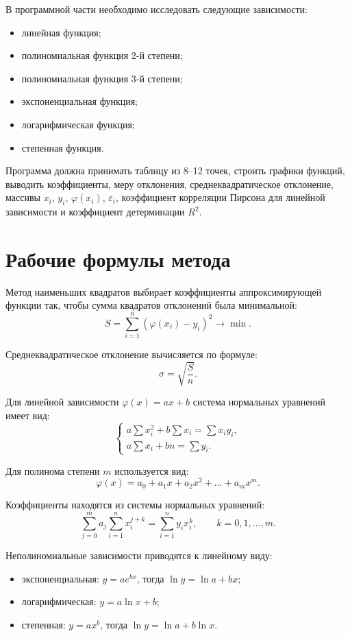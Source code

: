 \documentclass[a4paper,14pt]{extarticle}
\begin{document}
В программной части необходимо исследовать следующие зависимости:
\begin{itemize}
    \item линейная функция;
    \item полиномиальная функция 2-й степени;
    \item полиномиальная функция 3-й степени;
    \item экспоненциальная функция;
    \item логарифмическая функция;
    \item степенная функция.
\end{itemize}

Программа должна принимать таблицу из 8--12 точек, строить графики функций, выводить коэффициенты, меру отклонения, среднеквадратическое отклонение, массивы $x_i$, $y_i$, $\varphi(x_i)$, $\varepsilon_i$, коэффициент корреляции Пирсона для линейной зависимости и коэффициент детерминации $R^2$.

\section{Рабочие формулы метода}

Метод наименьших квадратов выбирает коэффициенты аппроксимирующей функции так, чтобы сумма квадратов отклонений была минимальной:
\[
    S = \sum_{i=1}^{n} \left(\varphi(x_i) - y_i\right)^2 \to \min.
\]

Среднеквадратическое отклонение вычисляется по формуле:
\[
    \sigma = \sqrt{\frac{S}{n}}.
\]

Для линейной зависимости $\varphi(x) = ax + b$ система нормальных уравнений имеет вид:
\[
\begin{cases}
    a\sum x_i^2 + b\sum x_i = \sum x_i y_i,\\
    a\sum x_i + bn = \sum y_i.
\end{cases}
\]

Для полинома степени $m$ используется вид:
\[
    \varphi(x) = a_0 + a_1x + a_2x^2 + \dots + a_mx^m.
\]

Коэффициенты находятся из системы нормальных уравнений:
\[
    \sum_{j=0}^{m} a_j \sum_{i=1}^{n} x_i^{j+k} = \sum_{i=1}^{n} y_i x_i^k,
    \qquad k = 0, 1, \dots, m.
\]

Неполиномиальные зависимости приводятся к линейному виду:
\begin{itemize}
    \item экспоненциальная: $y = ae^{bx}$, тогда $\ln y = \ln a + bx$;
    \item логарифмическая: $y = a\ln x + b$;
    \item степенная: $y = ax^b$, тогда $\ln y = \ln a + b\ln x$.
\end{itemize}
\end{document}

